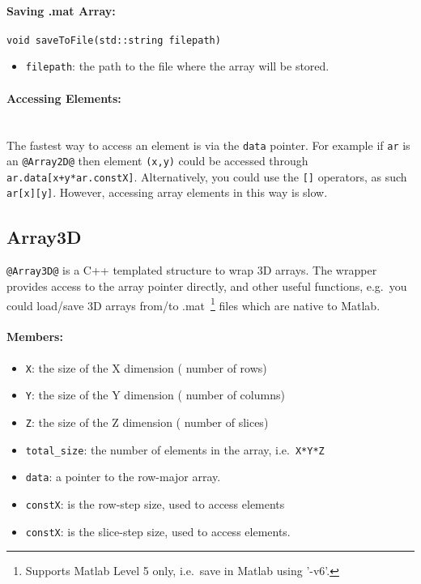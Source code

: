 \documentclass[12pt,letterpaper]{article}
\makeatletter
\def\keyhl[#1]{\lstinline{@#1@}}
\makeatother
\begin{document}
\paragraph{Saving .mat Array:}\hspace{-2ex}
\begin{lstlisting}
void saveToFile(std::string filepath)
\end{lstlisting}
\begin{itemize}
\item \lstinline{filepath}: the path to the file where the array will be stored.
\end{itemize}

\paragraph{Accessing Elements:}\hspace{-2ex}\\
The fastest way to access an element is via the \lstinline{data} pointer. For example if \lstinline{ar} is an \keyhl[Array2D] then element \lstinline{(x,y)} could be accessed through \lstinline{ar.data[x+y*ar.constX]}.
Alternatively, you could use the \lstinline{[]} operators, as such \lstinline{ar[x][y]}. However, accessing array elements in this way is slow.



\subsection{Array3D}
\keyhl[Array3D] is a C++ templated structure to wrap 3D arrays. The wrapper provides access to the array pointer directly, and other useful functions, e.g.~you could load/save 3D arrays from/to .mat~\footnote{Supports Matlab Level 5 only, i.e.~save in Matlab using '-v6'.} files which are native to Matlab.
\paragraph{Members:}\hspace{-2ex}
\begin{itemize}
\item \lstinline{X}: the size of the X dimension ( number of rows)
\item \lstinline{Y}: the size of the Y dimension ( number of columns)
\item \lstinline{Z}: the size of the Z dimension ( number of slices)
\item \lstinline{total_size}: the number of elements in the array, i.e.~\lstinline{X*Y*Z}
\item \lstinline{data}: a pointer to the row-major array.
\item \lstinline{constX}: is the row-step size, used to access elements
\item \lstinline{constX}: is the slice-step size, used to access elements.
\end{itemize}
\end{document}
